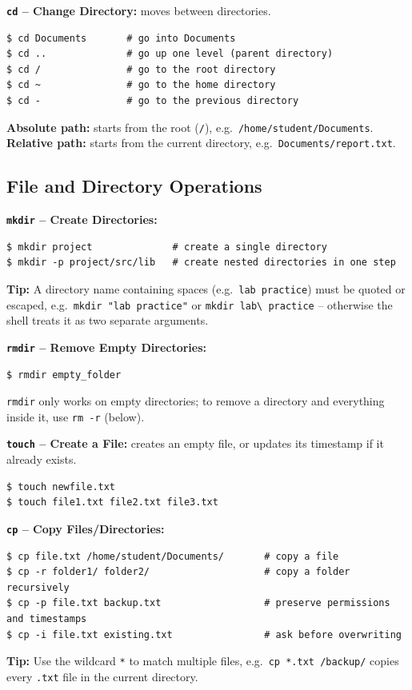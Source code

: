 \textbf{\texttt{cd} -- Change Directory:} moves between directories.
\begin{lstlisting}[language=Terminal]
$ cd Documents       # go into Documents
$ cd ..              # go up one level (parent directory)
$ cd /               # go to the root directory
$ cd ~               # go to the home directory
$ cd -               # go to the previous directory
\end{lstlisting}
\textbf{Absolute path:} starts from the root (\texttt{/}), e.g.\ \texttt{/home/student/Documents}.\\
\textbf{Relative path:} starts from the current directory, e.g.\ \texttt{Documents/report.txt}.

\subsection{File and Directory Operations}

\textbf{\texttt{mkdir} -- Create Directories:}
\begin{lstlisting}[language=Terminal]
$ mkdir project              # create a single directory
$ mkdir -p project/src/lib   # create nested directories in one step
\end{lstlisting}
\textbf{Tip:} A directory name containing spaces (e.g.\ \texttt{lab practice}) must be quoted or escaped, e.g.\ \texttt{mkdir "lab practice"} or \texttt{mkdir lab\textbackslash{} practice} -- otherwise the shell treats it as two separate arguments.

\textbf{\texttt{rmdir} -- Remove Empty Directories:}
\begin{lstlisting}[language=Terminal]
$ rmdir empty_folder
\end{lstlisting}
\texttt{rmdir} only works on empty directories; to remove a directory and everything inside it, use \texttt{rm -r} (below).

\textbf{\texttt{touch} -- Create a File:} creates an empty file, or updates its timestamp if it already exists.
\begin{lstlisting}[language=Terminal]
$ touch newfile.txt
$ touch file1.txt file2.txt file3.txt
\end{lstlisting}

\textbf{\texttt{cp} -- Copy Files/Directories:}
\begin{lstlisting}[language=Terminal]
$ cp file.txt /home/student/Documents/       # copy a file
$ cp -r folder1/ folder2/                    # copy a folder recursively
$ cp -p file.txt backup.txt                  # preserve permissions and timestamps
$ cp -i file.txt existing.txt                # ask before overwriting
\end{lstlisting}
\textbf{Tip:} Use the wildcard \texttt{*} to match multiple files, e.g.\ \texttt{cp *.txt /backup/} copies every \texttt{.txt} file in the current directory.

